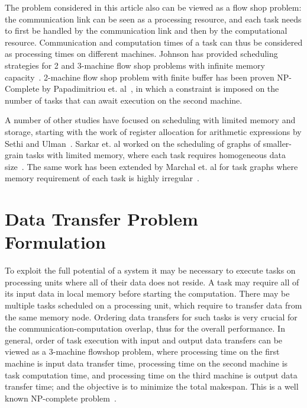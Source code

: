 \documentclass[runningheads]{llncs} %
\begin{document}
The problem considered in this article also can be viewed as a flow shop problem: the communication link can be seen as a processing resource, and each task needs to first be handled by the communication link and then by the computational resource. Communication and computation times of a task can thus be considered as processing times on different machines. Johnson has provided scheduling strategies for 2 and 3-machine flow shop problems with infinite memory capacity~\cite{johnson}. 2-machine flow shop problem with finite buffer has been proven NP-Complete by Papadimitriou et. al~\cite{Papadimitriou:1980:FSL:322203.322213}, in which a constraint is imposed on the number of tasks that can await execution on the second machine.

A number of other studies have focused on scheduling with limited memory and storage, starting with the work of register allocation for arithmetic expressions by Sethi and Ulman~\cite{Sethi:1970:GOC:321607.321620}. Sarkar et. al worked on the scheduling of graphs of smaller-grain tasks with limited memory, where each task requires homogeneous data size~\cite{vsarkar-pact}. The same work has been extended by Marchal et. al for task graphs where memory requirement of each task is highly irregular~\cite{loris-ipdps18}.


\section{Data Transfer Problem Formulation}
\label{sec:theoreticalProof}


To exploit the full potential of a system it may be necessary to execute tasks on processing
units where all of their data does not reside. A task may require all of its input data
in local memory before starting the computation. There may be multiple tasks
scheduled on a processing unit, which require to transfer data from the same
memory node. Ordering data transfers for such tasks is very crucial for the
communication-computation overlap, thus for the overall
performance. In general, order of task execution with input
and output data transfers can be  
viewed as a 3-machine flowshop problem, where processing time on the first machine is 
input data transfer time, processing time on the second machine is task computation time, 
and processing time on the third machine is output data transfer time; and the objective is 
to minimize the total makespan. This is a well known NP-complete problem~\cite{3machineFlowShopNPComplete}.
\end{document}
